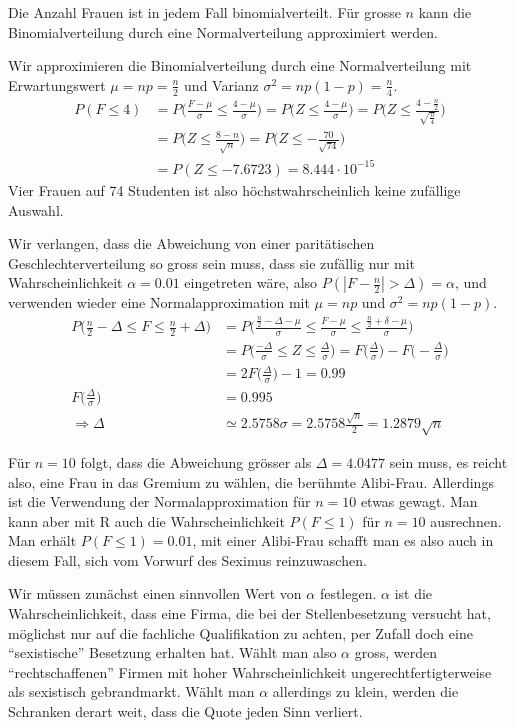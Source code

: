 
\begin{loesung}
Die Anzahl Frauen ist in jedem Fall binomialverteilt.
Für grosse $n$ kann die Binomialverteilung durch eine Normalverteilung
approximiert werden.
\begin{teilaufgaben}
\item
Wir approximieren die Binomialverteilung durch eine Normalverteilung
mit Erwartungswert $\mu=np=\frac{n}2$ und Varianz $\sigma^2=np(1-p)=\frac{n}4$.
\begin{align*}
P(F\le 4)
&=
P\biggl( \frac{F-\mu}{\sigma}\le \frac{4-\mu}{\sigma} \biggr)
=
P\biggl( Z\le \frac{4-\mu}{\sigma} \biggr)
=
P\biggl( Z\le \frac{4-\frac{n}2}{\sqrt{\frac{n}4}}\biggr)
\\
&=
P\biggl( Z\le \frac{8-n}{\sqrt{n}}\biggr)
=
P\biggl( Z\le -\frac{70}{\sqrt{74}}\biggr)
\\
&=
P(Z\le -7.6723)= 8.444\cdot 10^{-15}
\end{align*}
Vier Frauen auf 74 Studenten ist also höchstwahrscheinlich keine
zufällige Auswahl.
\item
Wir verlangen, dass die Abweichung von einer paritätischen
Geschlechterverteilung so gross sein muss, dass sie zufällig nur
mit Wahrscheinlichkeit $\alpha = 0.01$ eingetreten wäre, also
$P(|F-\frac{n}2| >\Delta)=\alpha$, und verwenden wieder eine
Normalapproximation mit $\mu=np$ und $\sigma^2=np(1-p)$.
\begin{align*}
P\biggl(\frac{n}2-\Delta\le F\le\frac{n}2+\Delta\biggr)
&=
P\biggl(\frac{\frac{n}2-\Delta-\mu}{\sigma}\le \frac{F-\mu}{\sigma}\le \frac{\frac{n}2+\delta-\mu}{\sigma}\biggr)
\\
&=
P\biggl(
\frac{-\Delta}{\sigma}\le Z\le \frac{\Delta}{\sigma}
\biggr)
=
F\biggl(\frac{\Delta}{\sigma}\biggr)
-
F\biggl(-\frac{\Delta}{\sigma}\biggr)
\\
&=
2F\biggl(\frac{\Delta}{\sigma}\biggr)-1=0.99
\\
F\biggl(\frac{\Delta}{\sigma}\biggr)&=0.995\\
\Rightarrow \Delta&\simeq 2.5758\sigma=2.5758\frac{ \sqrt{n}}2=1.2879\sqrt{n}
\end{align*}
\item
Für $n=10$ folgt, dass die Abweichung grösser als $\Delta = 4.0477$ sein
muss, es reicht also, eine Frau in das Gremium zu wählen, die berühmte
Alibi-Frau. Allerdings ist die Verwendung der Normalapproximation für
$n=10$ etwas gewagt. Man kann aber mit R auch die Wahrscheinlichkeit
$P(F\le 1)$ für $n=10$ ausrechnen. Man erhält $P(F\le 1)=0.01$, mit
einer Alibi-Frau schafft man es also auch in diesem Fall, sich vom
Vorwurf des Seximus reinzuwaschen.
\item
Wir müssen zunächst einen sinnvollen Wert von $\alpha$ festlegen. $\alpha$
ist die Wahrscheinlichkeit, dass eine Firma, die bei der Stellenbesetzung
versucht hat, möglichst nur auf die fachliche Qualifikation zu achten,
per Zufall doch eine ``sexistische'' Besetzung erhalten hat. Wählt man
also $\alpha$ gross, werden ``rechtschaffenen'' Firmen mit hoher
Wahrscheinlichkeit ungerechtfertigterweise als sexistisch gebrandmarkt.
Wählt man $\alpha$ allerdings zu klein, werden die Schranken derart weit,
dass die Quote jeden Sinn verliert.


\end{teilaufgaben}
\end{loesung}
